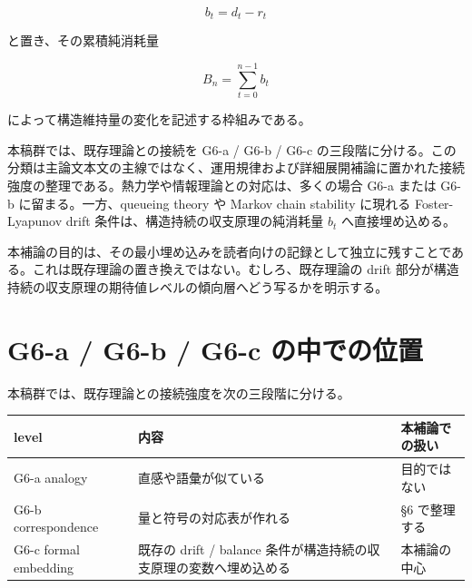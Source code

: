 \documentclass[12pt,a4paper]{article}
\begin{document}
\[
b_{t} = d_{t} - r_{t}
\]

と置き、その累積純消耗量

\[
B_{n} = \sum_{t=0}^{n-1} b_{t}
\]

によって構造維持量の変化を記述する枠組みである。

本稿群では、既存理論との接続を G6-a / G6-b / G6-c の三段階に分ける。この分類は主論文本文の主線ではなく、運用規律および詳細展開補論に置かれた接続強度の整理である。熱力学や情報理論との対応は、多くの場合 G6-a または G6-b に留まる。一方、queueing theory や Markov chain stability に現れる Foster-Lyapunov drift 条件は、構造持続の収支原理の純消耗量 \(b_{t}\) へ直接埋め込める。

本補論の目的は、その最小埋め込みを読者向けの記録として独立に残すことである。これは既存理論の置き換えではない。むしろ、既存理論の drift 部分が構造持続の収支原理の期待値レベルの傾向層へどう写るかを明示する。

\section{G6-a / G6-b / G6-c の中での位置}\label{g6-a-g6-b-g6-c-ux306eux4e2dux3067ux306eux4f4dux7f6e}

本稿群では、既存理論との接続強度を次の三段階に分ける。

{\def\LTcaptype{table} %
\begin{longtable}[]{@{}
  >{\raggedright\arraybackslash}p{}
  >{\raggedright\arraybackslash}p{}
  >{\raggedright\arraybackslash}p{}@{}}
\toprule\noalign{}
\begin{minipage}[b]{\linewidth}\raggedright
level
\end{minipage} & \begin{minipage}[b]{\linewidth}\raggedright
内容
\end{minipage} & \begin{minipage}[b]{\linewidth}\raggedright
本補論での扱い
\end{minipage} \\
\midrule\noalign{}
\endhead
\bottomrule\noalign{}
\endlastfoot
G6-a analogy & 直感や語彙が似ている & 目的ではない \\
G6-b correspondence & 量と符号の対応表が作れる & §6 で整理する \\
G6-c formal embedding & 既存の drift / balance 条件が構造持続の収支原理の変数へ埋め込める & 本補論の中心 \\
\end{longtable}
}
\end{document}
